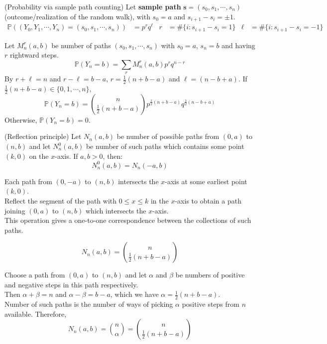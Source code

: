 \documentclass{huhtakm-template-book}
\newcommand{\prob}{\mathbb{P}}
\begin{document}
\begin{eg}(Probability via sample path counting)
	Let \textbf{sample path} $\mathbf{s}=(s_{0},s_{1},\cdots,s_{n})$ (outcome/realization of the random walk), with $s_{0}=a$ and $s_{i+1}-s_{i}=\pm 1$.
	\begin{align*}
		\prob((Y_{0},Y_{1},\cdots,Y_{n})=(s_{0},s_{1},\cdots,s_{n}))&=p^{r}q^{\ell} & r&=\#\{i:s_{i+1}-s_{i}=1\} & \ell&=\#\{i:s_{i+1}-s_{i}=-1\}
	\end{align*}
\end{eg}
\begin{eg}
	Let $M_{n}^{r}(a,b)$ be number of paths $(s_{0},s_{1},\cdots,s_{n})$ with $s_{0}=a$, $s_{n}=b$ and having $r$ rightward steps.
	\begin{equation*}
		\prob(Y_{n}=b)=\sum_{r} M_{n}^{r}(a,b)p^{r}q^{n-r}
	\end{equation*}
	By $r+\ell=n$ and $r-\ell=b-a$, $r=\frac{1}{2}(n+b-a)$ and $\ell=(n-b+a)$. If $\frac{1}{2}(n+b-a)\in\{0,1,\cdots,n\}$,
	\begin{equation*}
		\prob(Y_{n}=b)=\binom{n}{\frac{1}{2}(n+b-a)}p^{\frac{1}{2}(n+b-a)}q^{\frac{1}{2}(n-b+a)}
	\end{equation*}
	Otherwise, $\prob(Y_{n}=b)=0$.
\end{eg}
\begin{thm}(Reflection principle)
	Let $N_{n}(a,b)$ be number of possible paths from $(0,a)$ to $(n,b)$ and let $N_{n}^{0}(a,b)$ be number of such paths which contains some point $(k,0)$ on the $x$-axis. If $a,b>0$, then:
	\begin{equation*}
		N_{n}^{0}(a,b)=N_{n}(-a,b)
	\end{equation*}
\end{thm}
\begin{proofing}
	Each path from $(0,-a)$ to $(n,b)$ intersects the $x$-axis at some earliest point $(k,0)$.\\
	Reflect the segment of the path with $0\leq x\leq k$ in the $x$-axis to obtain a path joining $(0,a)$ to $(n,b)$ which intersects the $x$-axis.\\
	This operation gives a one-to-one correspondence between the collections of such paths.
\end{proofing}
\begin{lem}
	\label{Appendix A (Lemma) Number of paths calculation}
	\begin{equation*}
		N_{n}(a,b)=\binom{n}{\frac{1}{2}(n+b-a)}
	\end{equation*}
\end{lem}
\begin{proofing}
	Choose a path from $(0,a)$ to $(n,b)$ and let $\alpha$ and $\beta$ be numbers of positive and negative steps in this path respectively.\\
	Then $\alpha+\beta=n$ and $\alpha-\beta=b-a$, which we have $\alpha=\frac{1}{2}(n+b-a)$.\\
	Number of such paths is the number of ways of picking $\alpha$ positive steps from $n$ available. Therefore,
	\begin{equation*}
		N_{n}(a,b)=\binom{n}{\alpha}=\binom{n}{\frac{1}{2}(n+b-a)}
	\end{equation*}
\end{proofing}
\end{document}
